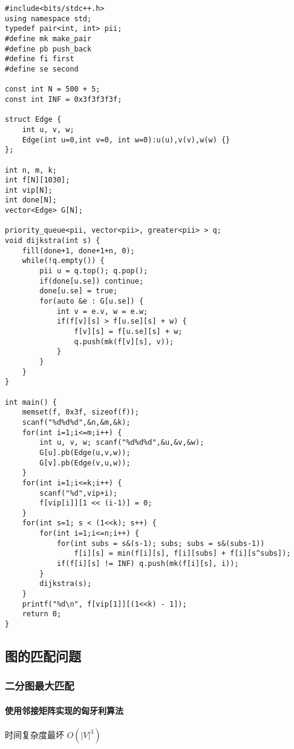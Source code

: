 \documentclass[UTF8]{ctexart}
\begin{document}
\begin{framed}
\begin{lstlisting}
#include<bits/stdc++.h>
using namespace std;
typedef pair<int, int> pii;
#define mk make_pair
#define pb push_back
#define fi first
#define se second

const int N = 500 + 5;
const int INF = 0x3f3f3f3f;

struct Edge {
    int u, v, w;
    Edge(int u=0,int v=0, int w=0):u(u),v(v),w(w) {}
};

int n, m, k;
int f[N][1030];
int vip[N];
int done[N];
vector<Edge> G[N];

priority_queue<pii, vector<pii>, greater<pii> > q;
void dijkstra(int s) {
    fill(done+1, done+1+n, 0);
    while(!q.empty()) {
        pii u = q.top(); q.pop();
        if(done[u.se]) continue;
        done[u.se] = true;
        for(auto &e : G[u.se]) {
            int v = e.v, w = e.w;
            if(f[v][s] > f[u.se][s] + w) {
                f[v][s] = f[u.se][s] + w;
                q.push(mk(f[v][s], v));
            }
        }
    }
}

int main() {
    memset(f, 0x3f, sizeof(f));
    scanf("%d%d%d",&n,&m,&k);
    for(int i=1;i<=m;i++) {
        int u, v, w; scanf("%d%d%d",&u,&v,&w);
        G[u].pb(Edge(u,v,w));
        G[v].pb(Edge(v,u,w));
    }
    for(int i=1;i<=k;i++) {
        scanf("%d",vip+i);
        f[vip[i]][1 << (i-1)] = 0;
    }
    for(int s=1; s < (1<<k); s++) {
        for(int i=1;i<=n;i++) {
            for(int subs = s&(s-1); subs; subs = s&(subs-1)) 
                f[i][s] = min(f[i][s], f[i][subs] + f[i][s^subs]);
            if(f[i][s] != INF) q.push(mk(f[i][s], i));
        }
        dijkstra(s);
    }
    printf("%d\n", f[vip[1]][(1<<k) - 1]);
    return 0;
}
\end{lstlisting}
\end{framed}

\subsection{图的匹配问题}
\subsubsection{二分图最大匹配}
\paragraph{使用邻接矩阵实现的匈牙利算法}

时间复杂度最坏 $O(|V|^3)$
\end{document}
